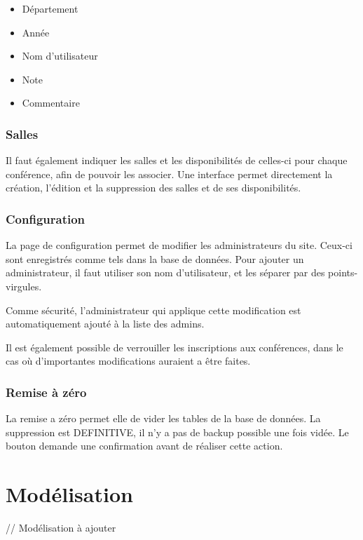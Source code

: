     \begin{itemize}
    \item Département
    \item Année
    \item Nom d'utilisateur
    \item Note
    \item Commentaire
    \end{itemize}

            \subsubsection{Salles}

Il faut également indiquer les salles et les disponibilités de celles-ci pour chaque conférence, afin de pouvoir les associer.
Une interface permet directement la création, l'édition et la suppression des salles et de ses disponibilités.

            \subsubsection{Configuration}

La page de configuration permet de modifier les administrateurs du site. Ceux-ci sont enregistrés comme tels dans la base de données.
Pour ajouter un administrateur, il faut utiliser son nom d'utilisateur, et les séparer par des points-virgules.

Comme sécurité, l'administrateur qui applique cette modification est automatiquement ajouté à la liste des admins.

Il est également possible de verrouiller les inscriptions aux conférences, dans le cas où d'importantes modifications
auraient a être faites.

            \subsubsection{Remise à zéro}

La remise a zéro permet elle de vider les tables de la base de données. La suppression est DEFINITIVE, il n'y a pas de
backup possible une fois vidée. Le bouton demande une confirmation avant de réaliser cette action.

    \section{Modélisation}

// Modélisation à ajouter

